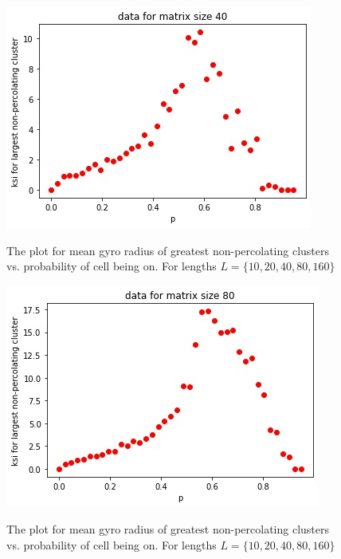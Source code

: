 \documentclass[12pt]{article}
\begin{document}
	\begin{figure}[h!]
	\centering
	\includegraphics[width=0.9\linewidth]{../p5/fig2.jpg}
	\label{fig:gyroCluste2}
	\caption{The plot for mean gyro radius  of greatest non-percolating clusters vs. probability of cell being on. For lengths $L = \{10, 20, 40, 80, 160\}$}
\end{figure}
	\begin{figure}[h!]
	\centering
	\includegraphics[width=0.9\linewidth]{../p5/fig3.jpg}
	\label{fig:gyroCluster3}
	\caption{The plot for mean gyro radius  of greatest non-percolating clusters vs. probability of cell being on. For lengths $L = \{10, 20, 40, 80, 160\}$}
\end{figure}
\end{document}
